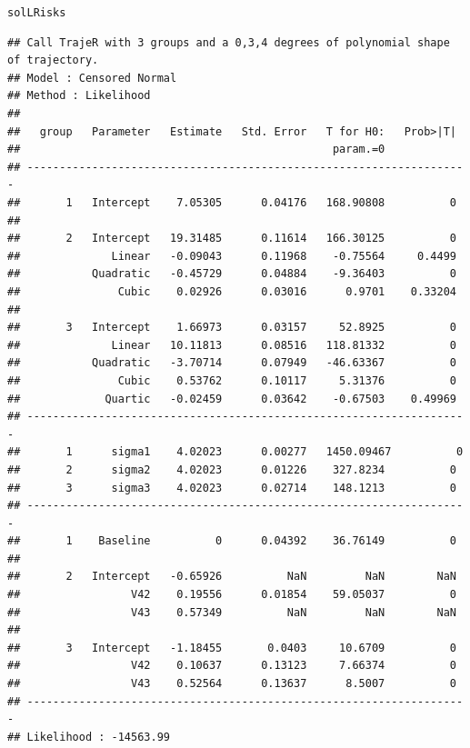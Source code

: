\documentclass{article}\usepackage[]{graphicx}\usepackage[]{color}
\makeatletter
\newcommand{\hlstd}[1]{\textcolor[rgb]{0.345,0.345,0.345}{#1}}%
\newenvironment{kframe}{%
 \def\at@end@of@kframe{}%
 \ifinner\ifhmode%
  \def\at@end@of@kframe{\end{minipage}}%
  \begin{minipage}{\columnwidth}%
 \fi\fi%
 \def\FrameCommand##1{\hskip\@totalleftmargin \hskip-\fboxsep
 \colorbox{shadecolor}{##1}\hskip-\fboxsep
     \hskip-\linewidth \hskip-\@totalleftmargin \hskip\columnwidth}%
 \MakeFramed {\advance\hsize-\width
   \@totalleftmargin\z@ \linewidth\hsize
   \@setminipage}}%
 {\par\unskip\endMakeFramed%
 \at@end@of@kframe}
\newenvironment{knitrout}{}{} %
\makeatother
\begin{document}
\begin{knitrout}
\color{fgcolor}\begin{kframe}
\begin{alltt}
\hlstd{solLRisks}
\end{alltt}
\begin{verbatim}
## Call TrajeR with 3 groups and a 0,3,4 degrees of polynomial shape of trajectory.
## Model : Censored Normal
## Method : Likelihood 
##  
##   group   Parameter   Estimate   Std. Error   T for H0:   Prob>|T|  
##                                                param.=0             
## --------------------------------------------------------------------
##       1   Intercept    7.05305      0.04176   168.90808          0  
##                                                                     
##       2   Intercept   19.31485      0.11614   166.30125          0  
##              Linear   -0.09043      0.11968    -0.75564     0.4499  
##           Quadratic   -0.45729      0.04884    -9.36403          0  
##               Cubic    0.02926      0.03016      0.9701    0.33204  
##                                                                     
##       3   Intercept    1.66973      0.03157     52.8925          0  
##              Linear   10.11813      0.08516   118.81332          0  
##           Quadratic   -3.70714      0.07949   -46.63367          0  
##               Cubic    0.53762      0.10117     5.31376          0  
##             Quartic   -0.02459      0.03642    -0.67503    0.49969  
## --------------------------------------------------------------------
##       1      sigma1    4.02023      0.00277   1450.09467          0  
##       2      sigma2    4.02023      0.01226    327.8234          0  
##       3      sigma3    4.02023      0.02714    148.1213          0  
## --------------------------------------------------------------------
##       1    Baseline          0      0.04392    36.76149          0  
##                                                                     
##       2   Intercept   -0.65926          NaN         NaN        NaN  
##                 V42    0.19556      0.01854    59.05037          0  
##                 V43    0.57349          NaN         NaN        NaN  
##                                                                     
##       3   Intercept   -1.18455       0.0403     10.6709          0  
##                 V42    0.10637      0.13123     7.66374          0  
##                 V43    0.52564      0.13637      8.5007          0  
## --------------------------------------------------------------------
## Likelihood : -14563.99
\end{verbatim}
\end{kframe}
\end{knitrout}
\end{document}

